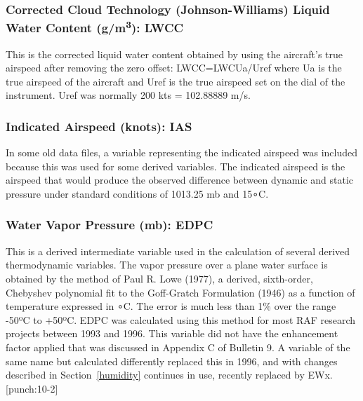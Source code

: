 \documentclass[
  english,
]{book}
\begin{document}
\hypertarget{jwlw-corrected}{%
\subsubsection*{\texorpdfstring{Corrected Cloud Technology (Johnson-Williams) Liquid Water Content (g/m\textsuperscript{3}): LWCC}{Corrected Cloud Technology (Johnson-Williams) Liquid Water Content (g/m3): LWCC}}\label{jwlw-corrected}}

This is the corrected liquid water content obtained by using the aircraft's true airspeed after removing the zero offset: LWCC=LWC{Ua/Uref} where {Ua} is the true airspeed of the aircraft and {Uref} is the true airspeed set on the dial of the instrument. {Uref} was normally 200 kts = 102.88889 m/s.

\hypertarget{ias}{%
\subsubsection*{Indicated Airspeed (knots): IAS}\label{ias}}

In some old data files, a variable representing the indicated airspeed was included because this was used for some derived variables. The indicated airspeed is the airspeed that would produce the observed difference between dynamic and static pressure under standard conditions of 1013.25 mb and {15∘}C.

\hypertarget{edpc}{%
\subsubsection*{Water Vapor Pressure (mb): EDPC}\label{edpc}}

This is a derived intermediate variable used in the calculation of several derived thermodynamic variables. The vapor pressure over a plane water surface is obtained by the method of Paul R. Lowe (1977), a derived, sixth-order, Chebyshev polynomial fit to the Goff-Gratch Formulation (1946) as a function of temperature expressed in {∘C}. The error is much less than 1\% over the range -50{º}C to +50{º}C. EDPC was calculated using this method for most RAF research projects between 1993 and 1996. This variable did not have the enhancement factor applied that was discussed in Appendix C of Bulletin 9. A variable of the same name but calculated differently replaced this in 1996, and with changes described in Section~\ref{humidity} continues in use, recently replaced by EWx.\protect\hypertarget{punch:10-2}{}{{[}punch:10-2{]}}
\end{document}
